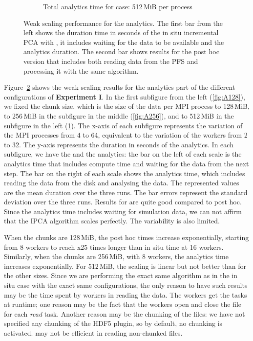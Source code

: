 \begin{figure}
\begin{subfigure}[b]{0.3\textwidth}
         \caption{Total analytics time for case: 512\,MiB per process}
         \label{fig:A512}
     \end{subfigure}
        \caption{Weak scaling performance for the analytics. The first bar from the left shows the duration time in seconds of the in situ incremental PCA with \deisa, it includes waiting for the data to be available and the analytics duration. The second bar shows results for the post hoc version that includes both reading data from the PFS and processing it with the same algorithm.}
        \label{fig:perfA1}
\end{figure}

Figure~\ref{fig:perfA1} shows the weak scaling results for the analytics part of the different configurations of \textbf{Experiment I}. 
In the first subfigure from the left (\ref{fig:A128}), we fixed the chunk size, which is the size of the data per MPI process to 128\,MiB, to 256\,MiB in the subfigure in the middle (\ref{fig:A256}), and to 512\,MiB in the subfigure in the left (\ref{fig:A512}). The x-axis of each subfigure represents the variation of the MPI processes from 4 to 64, equivalent to the variation of the \dask workers from 2 to 32. The y-axis represents the duration in seconds of the analytics. 
In each subfigure, we have the \deisa and the \dask analytics: the bar on the left of each scale is the \deisa analytics time that includes compute time and waiting for the data from the next step. The bar on the right of each scale shows the analytics time,  which includes reading the data from the disk and analysing the data. 
The represented values are the mean duration over the three runs. The bar errors represent the standard deviation over the three runs.       
Results for \deisa are quite good compared to post hoc. Since the analytics time includes waiting for simulation data, we can not affirm that the IPCA algorithm scales perfectly. The variability is also limited.

When the chunks are 128\,MiB, the post hoc times increase exponentially, starting from 8 workers to reach x25 times longer than in situ time at 16 workers. Similarly, when the chunks are 256\,MiB, with 8 workers, the analytics time increases exponentially. For 512\,MiB, the scaling is linear but not better than for the other sizes.
Since we are performing the exact same algorithm as in the in situ case with the exact same configurations, the only reason to have such results may be the time spent by \dask workers in reading the data. The \dask workers get the tasks at runtime; one reason may be the fact that the workers open and close the file for each \textit{read} task. 
Another reason may be the chunking of the files: we have not specified any chunking of the \pdi HDF5 plugin, so by default, no chunking is activated\cite{noauthor_pdidev_2022}. \dask may not be efficient in reading non-chunked files. 

